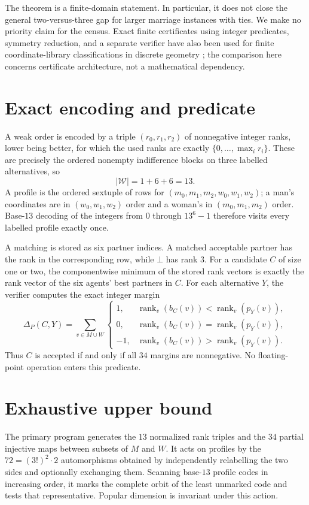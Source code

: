 \documentclass[11pt]{article}
\newcommand{\rank}{\operatorname{rank}}
\newcommand{\cW}{\mathcal W}
\begin{document}
The theorem is a finite-domain statement.  In particular, it does not close
the general two-versus-three gap for larger marriage instances with ties.  We
make no priority claim for the census.  Exact finite certificates using
integer predicates, symmetry reduction, and a separate verifier have also
been used for finite coordinate-library classifications in discrete geometry
\cite{ZengEtAl2026}; the comparison here concerns certificate architecture,
not a mathematical dependency.

\section{Exact encoding and predicate}

A weak order is encoded by a triple $(r_0,r_1,r_2)$ of nonnegative integer
ranks, lower being better, for which the used ranks are exactly
$\{0,\ldots,\max_i r_i\}$.  These are precisely the ordered nonempty
indifference blocks on three labelled alternatives, so
\[
 |\cW|=1+6+6=13.
\]
A profile is the ordered sextuple of rows for
$(m_0,m_1,m_2,w_0,w_1,w_2)$; a man's coordinates are in
$(w_0,w_1,w_2)$ order and a woman's in $(m_0,m_1,m_2)$ order.  Base-$13$
decoding of the integers from $0$ through $13^6-1$ therefore visits every
labelled profile exactly once.

A matching is stored as six partner indices.  A matched acceptable partner
has the rank in the corresponding row, while $\bot$ has rank $3$.  For a
candidate $C$ of size one or two, the componentwise minimum of the stored rank
vectors is exactly the rank vector of the six agents' best partners in $C$.
For each alternative $Y$, the verifier computes the exact integer margin
\[
 \Delta_P(C,Y)=\sum_{v\in M\cup W}
 \begin{cases}
  1,&\rank_v(b_C(v))<\rank_v(p_Y(v)),\\
  0,&\rank_v(b_C(v))=\rank_v(p_Y(v)),\\
 -1,&\rank_v(b_C(v))>\rank_v(p_Y(v)).
 \end{cases}
\]
Thus $C$ is accepted if and only if all $34$ margins are nonnegative.  No
floating-point operation enters this predicate.

\section{Exhaustive upper bound}

The primary program generates the $13$ normalized rank triples and the $34$
partial injective maps between subsets of $M$ and $W$.  It acts on profiles by
the $72=(3!)^2\cdot2$ automorphisms obtained by independently relabelling the
two sides and optionally exchanging them.  Scanning base-$13$ profile codes in
increasing order, it marks the complete orbit of the least unmarked code and
tests that representative.  Popular dimension is invariant under this action.
\end{document}
